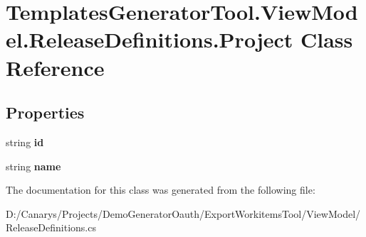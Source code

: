\hypertarget{class_templates_generator_tool_1_1_view_model_1_1_release_definitions_1_1_project}{}\section{Templates\+Generator\+Tool.\+View\+Model.\+Release\+Definitions.\+Project Class Reference}
\label{class_templates_generator_tool_1_1_view_model_1_1_release_definitions_1_1_project}
\subsection*{Properties}
\begin{DoxyCompactItemize}
\item 
\mbox{\label{class_templates_generator_tool_1_1_view_model_1_1_release_definitions_1_1_project_a1b7b87af9cff7411624a9bed02835f99}} 
string {\bfseries id}
\item 
\mbox{\label{class_templates_generator_tool_1_1_view_model_1_1_release_definitions_1_1_project_a7f3466f6040eec66001380871526321d}} 
string {\bfseries name}
\end{DoxyCompactItemize}


The documentation for this class was generated from the following file\+:\begin{DoxyCompactItemize}
\item 
D\+:/\+Canarys/\+Projects/\+Demo\+Generator\+Oauth/\+Export\+Workitems\+Tool/\+View\+Model/Release\+Definitions.\+cs\end{DoxyCompactItemize}
